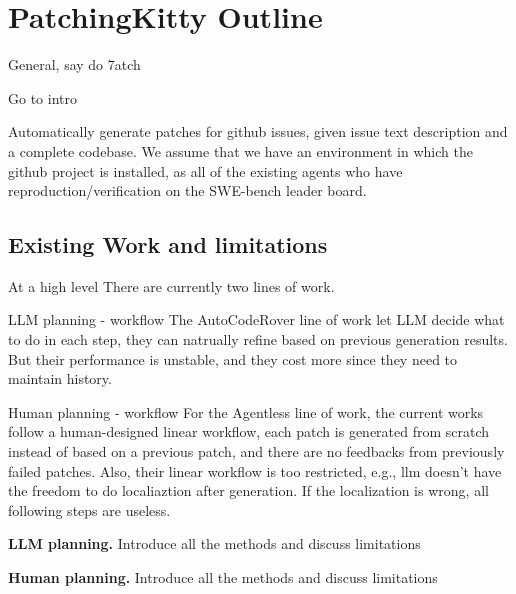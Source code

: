 \section{PatchingKitty Outline}

General, say do 7atch

Go to intro

Automatically generate patches for github issues, given issue text description and a complete codebase. We assume that we have an environment in which the github project is installed, as all of the existing agents who have reproduction/verification on the SWE-bench leader board.

\subsection{Existing Work and limitations}

At a high level
There are currently two lines of work. 

LLM planning - workflow
The AutoCodeRover line of work let LLM decide what to do in each step, they can natrually refine based on previous generation results. But their performance is unstable, and they cost more since they need to maintain history. 

Human planning - workflow
For the Agentless line of work, the current works follow a human-designed linear workflow, each patch is generated from scratch instead of based on a previous patch, and there are no feedbacks from previously failed patches. Also, their linear workflow is too restricted, e.g., llm doesn't have the freedom to do localiaztion after generation. If the localization is wrong, all following steps are useless. 


\noindent\textbf{LLM planning.}
Introduce all the methods and discuss limitations


\noindent\textbf{Human planning.}
Introduce all the methods and discuss limitations


